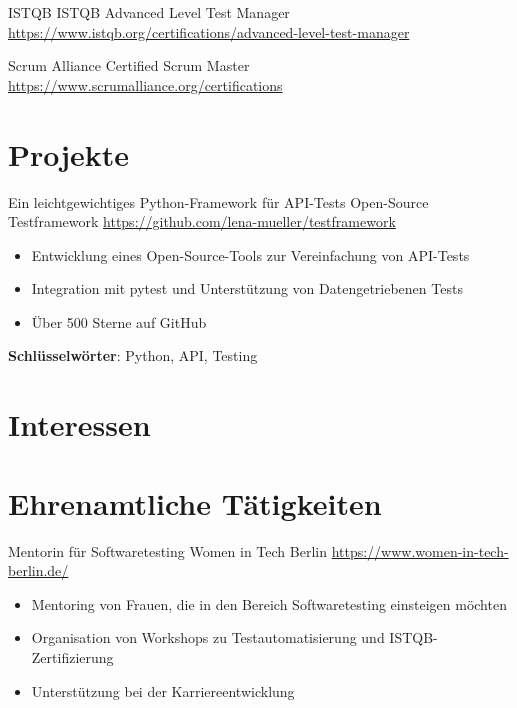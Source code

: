 \documentclass[a4paper, serif, 10pt]{moderncv}
\begin{document}
        {ISTQB}
        {ISTQB Advanced Level Test Manager}
        {\url{https://www.istqb.org/certifications/advanced-level-test-manager}}
        {}
        {}

        {Scrum Alliance}
        {Certified Scrum Master}
        {\url{https://www.scrumalliance.org/certifications}}
        {}
        {}
\section{Projekte}

        {Ein leichtgewichtiges Python-Framework für API-Tests}
        {Open-Source Testframework}
        {\url{https://github.com/lena-mueller/testframework}}
        {}
        {\begin{itemize}
\item Entwicklung eines Open-Source-Tools zur Vereinfachung von API-Tests
\item Integration mit pytest und Unterstützung von Datengetriebenen Tests
\item Über 500 Sterne auf GitHub
\end{itemize}
\textbf{Schlüsselwörter}: Python, API, Testing}
\section{Interessen}

\section{Ehrenamtliche Tätigkeiten}

        {Mentorin für Softwaretesting}
        {Women in Tech Berlin}
        {\url{https://www.women-in-tech-berlin.de/}}
        {}
        {\begin{itemize}
\item Mentoring von Frauen, die in den Bereich Softwaretesting einsteigen möchten
\item Organisation von Workshops zu Testautomatisierung und ISTQB-Zertifizierung
\item Unterstützung bei der Karriereentwicklung
\end{itemize}}
    
\end{document}
